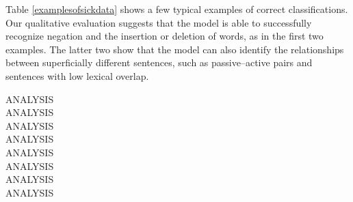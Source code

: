 

Table \ref{examplesofsickdata} shows a few typical examples of correct classifications. Our qualitative evaluation suggests that the model is able to successfully recognize negation and the insertion or deletion of words, as in the first two examples. The latter two show that the model can also identify the relationships between superficially different sentences, such as passive--active pairs and sentences with low lexical overlap.

ANALYSIS\\
ANALYSIS\\
ANALYSIS\\
ANALYSIS\\
ANALYSIS\\
ANALYSIS\\
ANALYSIS\\
ANALYSIS\\